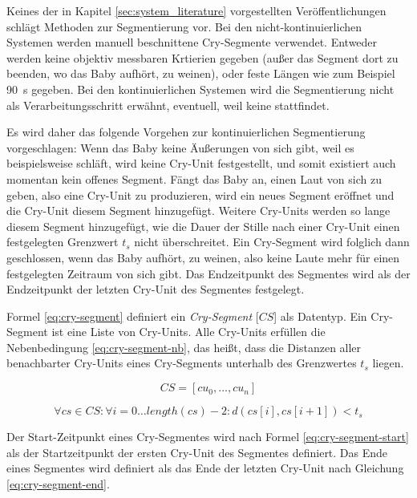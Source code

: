 Keines der in Kapitel \ref{sec:system_literature} vorgestellten Veröffentlichungen schlägt Methoden zur Segmentierung vor. Bei den nicht-kontinuierlichen Systemen werden manuell beschnittene Cry-Segmente verwendet. Entweder werden keine objektiv messbaren Krtierien gegeben (außer \grqq das Segment dort zu beenden, wo das Baby aufhört, zu weinen\grqq{}), oder feste Längen wie zum Beispiel \SI{90}{\second}\cite[S. 324]{rythmic} gegeben. Bei den kontinuierlichen Systemen wird die Segmentierung nicht als Verarbeitungsschritt erwähnt, eventuell, weil keine stattfindet.

Es wird daher das folgende Vorgehen zur kontinuierlichen Segmentierung vorgeschlagen: Wenn das Baby keine Äußerungen von sich gibt, weil es beispielsweise schläft, wird keine Cry-Unit festgestellt, und somit existiert auch momentan kein offenes Segment. Fängt das Baby an, einen Laut von sich zu geben, also eine Cry-Unit zu produzieren, wird ein neues Segment eröffnet und die Cry-Unit diesem Segment hinzugefügt. Weitere Cry-Units werden so lange diesem Segment hinzugefügt, wie die Dauer der Stille nach einer Cry-Unit einen festgelegten Grenzwert $t_{s}$ nicht überschreitet. Ein Cry-Segment wird folglich dann geschlossen, wenn das Baby \glqq aufhört, zu weinen\grqq{}, also keine Laute mehr für einen festgelegten Zeitraum von sich gibt. Das Endzeitpunkt des Segmentes wird als der Endzeitpunkt der letzten Cry-Unit des Segmentes festgelegt.

Formel \ref{eq:cry-segment}  definiert ein \emph{Cry-Segment} [$CS$] als Datentyp. Ein Cry-Segment ist eine Liste von Cry-Units. Alle Cry-Units erfüllen die Nebenbedingung \ref{eq:cry-segment-nb}, das heißt, dass die Distanzen aller benachbarter Cry-Units eines Cry-Segments unterhalb des Grenzwertes $t_{s}$ liegen.

\begin{equation}
CS = [cu_0 ,  \ldots,  cu_n]
\label{eq:cry-segment}
\end{equation}

\begin{equation}
\forall cs \in CS: \forall i = 0 \ldots length(cs)-2 : d(cs[i], cs[i+1]) < t_{s}
\label{eq:cry-segment-nb}
\end{equation}

Der Start-Zeitpunkt eines Cry-Segmentes wird nach Formel \ref{eq:cry-segment-start} als der Startzeitpunkt der ersten Cry-Unit des Segmentes definiert. Das Ende eines Segmentes wird definiert als das Ende der letzten Cry-Unit nach Gleichung \ref{eq:cry-segment-end}.

